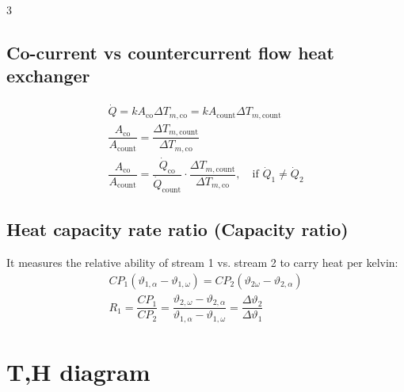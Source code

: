 \documentclass[9pt, landscape, a4paper]{article}
\begin{document}
\begin{multicols*}{3}
\subsection{Co-current vs countercurrent flow heat exchanger}
\begin{gather*}
  \dot{Q} = kA_\text{co}\Delta T_{m,\text{co}} = kA_\text{count}\Delta T_{m,\text{count}}\\
  \dfrac{A_\text{co}}{A_\text{count}} = \dfrac{\Delta T_{m,\text{count}}}{\Delta T_{m,\text{co}}}\\[1ex]
  \dfrac{A_\text{co}}{A_\text{count}} = \dfrac{\dot{Q}_\text{co}}{\dot{Q}_\text{count}}\cdot \dfrac{\Delta T_{m,\text{count}}}{\Delta T_{m,\text{co}}},\quad \text{if } \dot{Q}_1 \neq \dot{Q}_2
\end{gather*}

\subsection{Heat capacity rate ratio (Capacity ratio)}
It measures the relative ability of stream 1 vs. stream 2 to carry
heat per kelvin:
\begin{gather*}
  CP_1 \left(\vartheta_{1, \alpha} - \vartheta _{1, \omega}\right) = CP_2 \left(\vartheta_{2\omega} - \vartheta_{2,\alpha}\right)\\[1ex]
  R_1 = \dfrac{CP_1}{CP_2} = \dfrac{\vartheta_{2,\omega} - \vartheta_{2,\alpha}}{\vartheta_{1,\alpha}-\vartheta_{1,\omega}} = \dfrac{\Delta \vartheta_2}{\Delta \vartheta_1}
\end{gather*}

\section{T,H diagram}

\end{multicols*}
\end{document}
